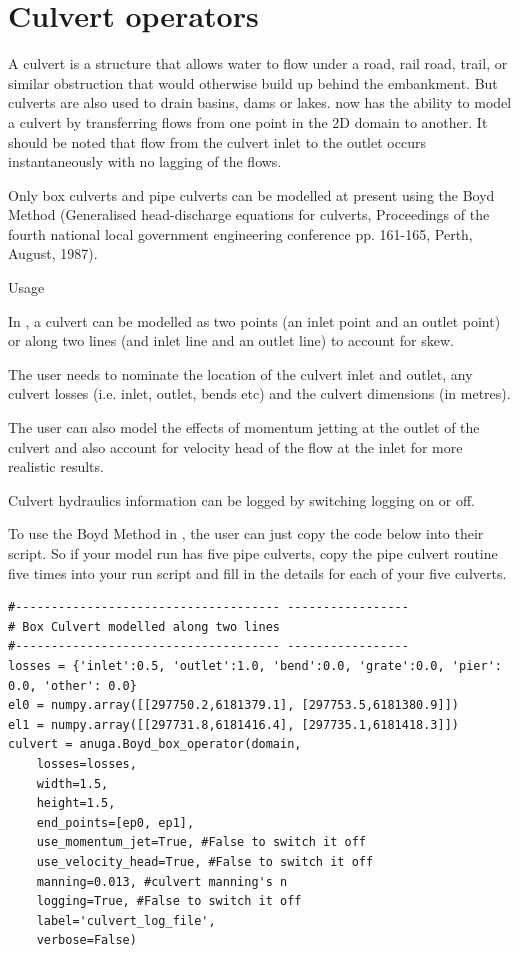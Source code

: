 \documentclass{manual}
\begin{document}
\section{Culvert operators}

A culvert is a structure that allows water to flow under a road, rail road, trail, or similar obstruction that would otherwise build up behind the embankment. But culverts are also used to drain basins, dams or lakes. \anuga now has the ability to model a culvert by transferring flows from one point in the 2D domain to another. It should be noted that flow from the culvert inlet to the outlet occurs instantaneously with no lagging of the flows.

Only box culverts and pipe culverts can be modelled at present using the Boyd Method (Generalised head-discharge equations for culverts, Proceedings of the fourth national local government engineering conference pp. 161-165, Perth, August, 1987).

Usage

In \anuga, a culvert can be modelled as two points (an inlet point and an outlet point) or along two lines (and inlet line and an outlet line) to account for skew.

The user needs to nominate the location of the culvert inlet and outlet, any culvert losses (i.e. inlet, outlet, bends etc) and the culvert dimensions (in metres). 

The user can also model the effects of momentum jetting at the outlet of the culvert and also account for velocity head of the flow at the inlet for more realistic results.

Culvert hydraulics information can be logged by switching logging on or off.

To use the Boyd Method in \anuga, the user can just copy the code below into their script. So if your model run has five pipe culverts, copy the pipe culvert routine five times into your run script and fill in the details for each of your five culverts.
\begin{verbatim}
#------------------------------------- -----------------
# Box Culvert modelled along two lines 
#------------------------------------- -----------------
losses = {'inlet':0.5, 'outlet':1.0, 'bend':0.0, 'grate':0.0, 'pier': 0.0, 'other': 0.0} 
el0 = numpy.array([[297750.2,6181379.1], [297753.5,6181380.9]]) 
el1 = numpy.array([[297731.8,6181416.4], [297735.1,6181418.3]])  
culvert = anuga.Boyd_box_operator(domain, 
    losses=losses, 
    width=1.5, 
    height=1.5, 
    end_points=[ep0, ep1], 
    use_momentum_jet=True, #False to switch it off
    use_velocity_head=True, #False to switch it off
    manning=0.013, #culvert manning's n
    logging=True, #False to switch it off
    label='culvert_log_file', 
    verbose=False)  
\end{verbatim}
\end{document}
